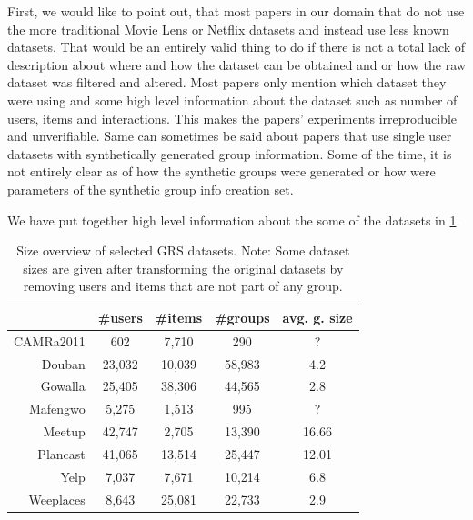 First, we would like to point out, that most papers in our domain that do not use the more traditional Movie Lens or Netflix datasets and instead use less known datasets. That would be an entirely valid thing to do if there is not a total lack of description about where and how the dataset can be obtained and or how the raw dataset was filtered and altered. Most papers only mention which dataset they were using and some high level information about the dataset such as number of users, items and interactions. This makes the papers' experiments irreproducible and unverifiable. Same can sometimes be said about papers that use single user datasets with synthetically generated group information. Some of the time, it is not entirely clear as of how the synthetic groups were generated or how were parameters of the synthetic group info creation set.

We have put together high level information about the some of the datasets in \ref{table:5.2_GRS_datasets_comparation}.

\begin{table}[!ht]
    \centering
    \begin{tabular}{ r | c c c c }
         & \#users & \#items & \#groups & avg. g. size \\
        \hline
            CAMRa2011\cite{attentative_group_recommendation}
                & 602 & 7,710 & 290 & ? \\
            Douban\cite{gowalla_weeplaces_yelp}
                & 23,032 & 10,039 & 58,983 & 4.2 \\
            Gowalla\cite{gowalla_weeplaces_yelp}
                & 25,405 &  38,306 & 44,565 &  2.8 \\
            Mafengwo\cite{attentative_group_recommendation}
                & 5,275 & 1,513 & 995 & ? \\
            Meetup\cite{meetup_origin}
                & 42,747 & 2,705 & 13,390 & 16.66 \\
            Plancast\cite{meetup_plancast}
                & 41,065 & 13,514 & 25,447 & 12.01 \\
            Yelp\cite{gowalla_weeplaces_yelp}
                & 7,037 & 7,671 & 10,214 & 6.8 \\
            Weeplaces\cite{gowalla_weeplaces_yelp}
                &  8,643 & 25,081 & 22,733 & 2.9 \\
    \end{tabular}
    \caption[Size overview of selected GRS datasets]{Size overview of selected GRS datasets. Note: Some dataset sizes are given after transforming the original datasets by removing users and items that are not part of any group.}
    \label{table:5.2_GRS_datasets_comparation}
\end{table}


